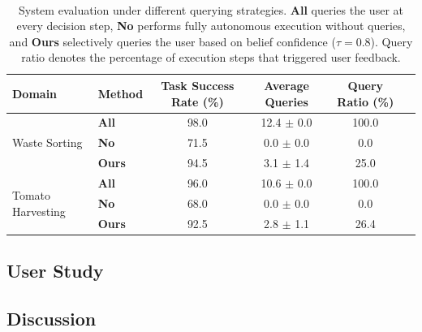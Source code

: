 \begin{table}[t]~\label{{tab:system_eval}}
\centering
\caption{System evaluation under different querying strategies. \textbf{All} queries the user at every decision step, \textbf{No} performs fully autonomous execution without queries, and \textbf{Ours} selectively queries the user based on belief confidence ($\tau=0.8$). Query ratio denotes the percentage of execution steps that triggered user feedback.}
\label{tab:system_eval}
\begin{tabular}{llcccc}
\toprule
\textbf{Domain} & \textbf{Method} & \textbf{Task Success Rate (\%)} & \textbf{Average Queries} & \textbf{Query Ratio (\%)} \\
\midrule

\multirow{3}{*}{Waste Sorting}
& \textbf{All}  & 98.0 & 12.4 $\pm$ 0.0 & 100.0 \\
& \textbf{No}   & 71.5 & 0.0 $\pm$ 0.0  & 0.0 \\
& \textbf{Ours} & 94.5 & 3.1 $\pm$ 1.4  & 25.0 \\
\midrule

\multirow{3}{*}{Tomato Harvesting}
& \textbf{All}  & 96.0 & 10.6 $\pm$ 0.0 & 100.0 \\
& \textbf{No}   & 68.0 & 0.0 $\pm$ 0.0  & 0.0 \\
& \textbf{Ours} & 92.5 & 2.8 $\pm$ 1.1  & 26.4 \\
\bottomrule
\end{tabular}
\end{table}








\subsection{User Study}




\subsection{Discussion}